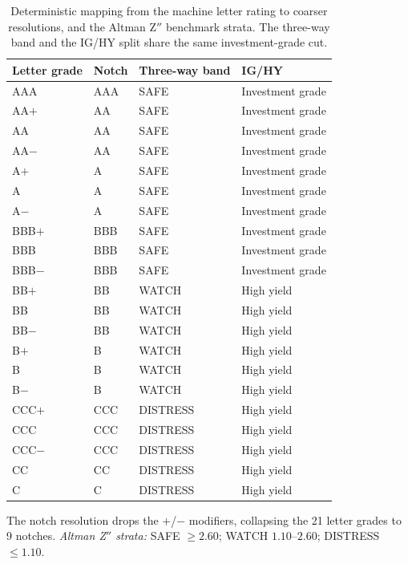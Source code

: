 \documentclass[a4paper,fleqn]{cas-sc}
\begin{document}
\begin{table}[t]\centering
\caption{Deterministic mapping from the machine letter rating to coarser resolutions, and the Altman
Z$''$ benchmark strata. The three-way band and the IG/HY split share the same investment-grade cut.}
\label{tab:map}
\begin{tabular}{llll}\toprule
Letter grade & Notch & Three-way band & IG/HY \\\midrule
AAA & AAA & SAFE & Investment grade \\
AA$+$ & AA & SAFE & Investment grade \\
AA & AA & SAFE & Investment grade \\
AA$-$ & AA & SAFE & Investment grade \\
A$+$ & A & SAFE & Investment grade \\
A & A & SAFE & Investment grade \\
A$-$ & A & SAFE & Investment grade \\
BBB$+$ & BBB & SAFE & Investment grade \\
BBB & BBB & SAFE & Investment grade \\
BBB$-$ & BBB & SAFE & Investment grade \\\midrule
BB$+$ & BB & WATCH & High yield \\
BB & BB & WATCH & High yield \\
BB$-$ & BB & WATCH & High yield \\
B$+$ & B & WATCH & High yield \\
B & B & WATCH & High yield \\
B$-$ & B & WATCH & High yield \\\midrule
CCC$+$ & CCC & DISTRESS & High yield \\
CCC & CCC & DISTRESS & High yield \\
CCC$-$ & CCC & DISTRESS & High yield \\
CC & CC & DISTRESS & High yield \\
C & C & DISTRESS & High yield \\\bottomrule
\end{tabular}

\vspace{3pt}
{\footnotesize\raggedright The notch resolution drops the $+$/$-$ modifiers, collapsing
the 21 letter grades to 9 notches. \emph{Altman Z$''$ strata:} SAFE $\ge 2.60$;
WATCH $1.10$--$2.60$; DISTRESS $\le 1.10$.\par}
\end{table}
\end{document}
